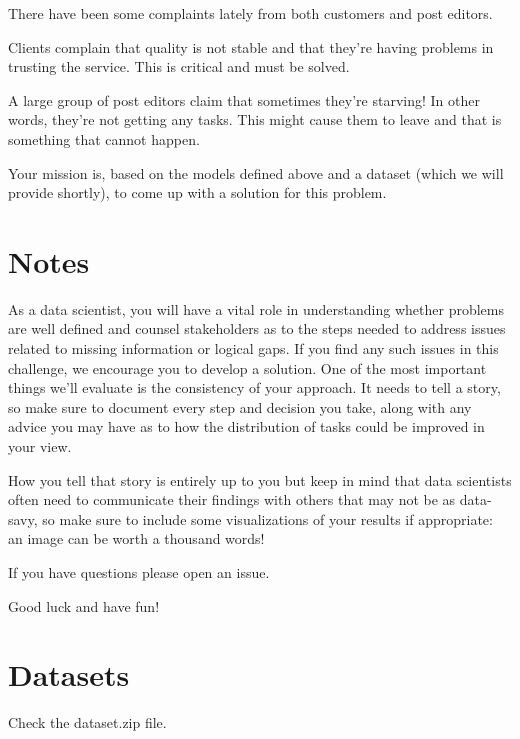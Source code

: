 \documentclass[]{extarticle}
\begin{document}
There have been some complaints lately from both customers and post editors.

Clients complain that quality is not stable and that they're having problems in trusting the service.
This is critical and must be solved.

A large group of post editors claim that sometimes they're starving!
In other words, they're not getting any tasks.
This might cause them to leave and that is something that cannot happen.

Your mission is, based on the models defined above and a dataset (which we will provide shortly), to come up with a solution for this problem.


\section{Notes}\label{sec:notes}

As a data scientist, you will have a vital role in understanding whether problems are well defined and counsel stakeholders as to the steps needed to address issues related to missing information or logical gaps.
If you find any such issues in this challenge, we encourage you to develop a solution.
One of the most important things we'll evaluate is the consistency of your approach.
It needs to tell a story, so make sure to document every step and decision you take, along with any advice you may have as to how the distribution of tasks could be improved in your view.

How you tell that story is entirely up to you but keep in mind that data scientists often need to communicate their findings with others that may not be as data-savy, so make sure to include some visualizations of your results if appropriate: an image can be worth a thousand words!

If you have questions please open an issue.

Good luck and have fun!

\section{Datasets}\label{sec:datasets}

Check the dataset.zip file.
\end{document}
